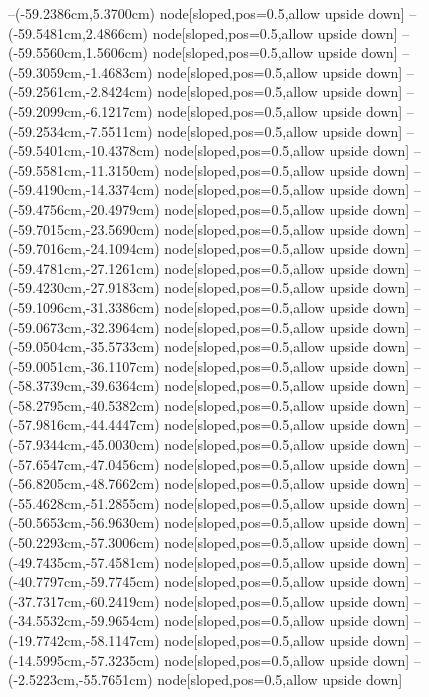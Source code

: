 --(-59.2386cm,5.3700cm) node[sloped,pos=0.5,allow upside down]{\ArrowIn}
--(-59.5481cm,2.4866cm) node[sloped,pos=0.5,allow upside down]{\ArrowIn}
--(-59.5560cm,1.5606cm) node[sloped,pos=0.5,allow upside down]{\arrowIn}
--(-59.3059cm,-1.4683cm) node[sloped,pos=0.5,allow upside down]{\ArrowIn}
--(-59.2561cm,-2.8424cm) node[sloped,pos=0.5,allow upside down]{\ArrowIn}
--(-59.2099cm,-6.1217cm) node[sloped,pos=0.5,allow upside down]{\ArrowIn}
--(-59.2534cm,-7.5511cm) node[sloped,pos=0.5,allow upside down]{\ArrowIn}
--(-59.5401cm,-10.4378cm) node[sloped,pos=0.5,allow upside down]{\ArrowIn}
--(-59.5581cm,-11.3150cm) node[sloped,pos=0.5,allow upside down]{\arrowIn}
--(-59.4190cm,-14.3374cm) node[sloped,pos=0.5,allow upside down]{\ArrowIn}
--(-59.4756cm,-20.4979cm) node[sloped,pos=0.5,allow upside down]{\ArrowIn}
--(-59.7015cm,-23.5690cm) node[sloped,pos=0.5,allow upside down]{\ArrowIn}
--(-59.7016cm,-24.1094cm) node[sloped,pos=0.5,allow upside down]{\arrowIn}
--(-59.4781cm,-27.1261cm) node[sloped,pos=0.5,allow upside down]{\ArrowIn}
--(-59.4230cm,-27.9183cm) node[sloped,pos=0.5,allow upside down]{\arrowIn}
--(-59.1096cm,-31.3386cm) node[sloped,pos=0.5,allow upside down]{\ArrowIn}
--(-59.0673cm,-32.3964cm) node[sloped,pos=0.5,allow upside down]{\ArrowIn}
--(-59.0504cm,-35.5733cm) node[sloped,pos=0.5,allow upside down]{\ArrowIn}
--(-59.0051cm,-36.1107cm) node[sloped,pos=0.5,allow upside down]{\arrowIn}
--(-58.3739cm,-39.6364cm) node[sloped,pos=0.5,allow upside down]{\ArrowIn}
--(-58.2795cm,-40.5382cm) node[sloped,pos=0.5,allow upside down]{\arrowIn}
--(-57.9816cm,-44.4447cm) node[sloped,pos=0.5,allow upside down]{\ArrowIn}
--(-57.9344cm,-45.0030cm) node[sloped,pos=0.5,allow upside down]{\arrowIn}
--(-57.6547cm,-47.0456cm) node[sloped,pos=0.5,allow upside down]{\ArrowIn}
--(-56.8205cm,-48.7662cm) node[sloped,pos=0.5,allow upside down]{\ArrowIn}
--(-55.4628cm,-51.2855cm) node[sloped,pos=0.5,allow upside down]{\ArrowIn}
--(-50.5653cm,-56.9630cm) node[sloped,pos=0.5,allow upside down]{\ArrowIn}
--(-50.2293cm,-57.3006cm) node[sloped,pos=0.5,allow upside down]{\arrowIn}
--(-49.7435cm,-57.4581cm) node[sloped,pos=0.5,allow upside down]{\arrowIn}
--(-40.7797cm,-59.7745cm) node[sloped,pos=0.5,allow upside down]{\ArrowIn}
--(-37.7317cm,-60.2419cm) node[sloped,pos=0.5,allow upside down]{\ArrowIn}
--(-34.5532cm,-59.9654cm) node[sloped,pos=0.5,allow upside down]{\ArrowIn}
--(-19.7742cm,-58.1147cm) node[sloped,pos=0.5,allow upside down]{\ArrowIn}
--(-14.5995cm,-57.3235cm) node[sloped,pos=0.5,allow upside down]{\ArrowIn}
--(-2.5223cm,-55.7651cm) node[sloped,pos=0.5,allow upside down]{\ArrowIn}
